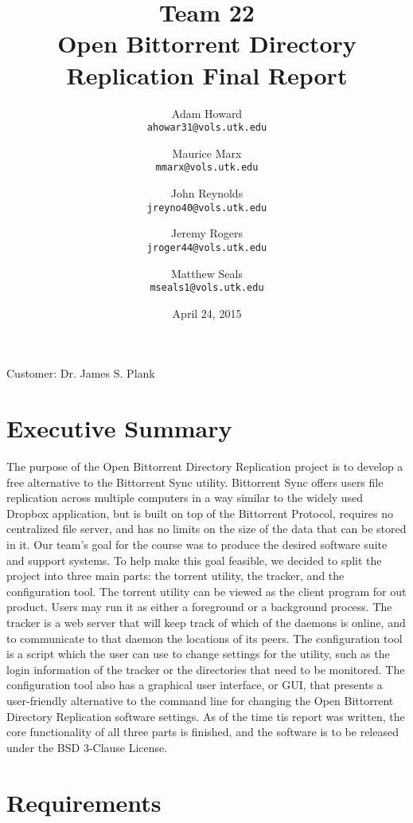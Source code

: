 \documentclass[12 pt]{article}
\title{Team 22 \\
	Open Bittorrent Directory Replication Final Report}
\author{Adam Howard \\
	\texttt{ahowar31@vols.utk.edu}
	\and
	Maurice Marx \\
	\texttt{mmarx@vols.utk.edu}
	\and
	John Reynolds \\
	\texttt{jreyno40@vols.utk.edu}
	\and
	Jeremy Rogers \\
	\texttt{jroger44@vols.utk.edu}
	\and
	Matthew Seals \\
	\texttt{mseals1@vols.utk.edu}}
\date{April 24, 2015}
\begin{document}
	\maketitle
	\vspace{180 pt}
	Customer: Dr. James S. Plank
	\pagebreak
	\doublespacing
	
	\tableofcontents
	
	\pagebreak
	
	\section{Executive Summary}
	
	The purpose of the Open Bittorrent Directory Replication project is to develop a free alternative to the Bittorrent Sync utility. Bittorrent Sync offers users file replication across multiple computers in a way similar to the widely used Dropbox application, but is built on top of the Bittorrent Protocol, requires no centralized file server, and has no limits on the size of the data that can be stored in it. Our team's goal for the course was to produce the desired software suite and support systems. To help make this goal feasible, we decided to split the project into three main parts: the torrent utility, the tracker, and the configuration tool. The torrent utility can be viewed as the client program for out product. Users may run it as either a foreground or a background process. The tracker is a web server that will keep track of which of the daemons is online, and to communicate to that daemon the locations of its peers. The configuration tool is a script which the user can use to change settings for the utility, such as the login information of the tracker or the directories that need to be monitored. The configuration tool also has a graphical user interface, or GUI, that presents a user-friendly alternative to the command line for changing the Open Bittorrent Directory Replication software settings. As of the time tis report was written, the core functionality of all three parts is finished, and the software is to be released under the BSD 3-Clause License.
	
	\pagebreak
	
	\section{Requirements}
	
\end{document}
